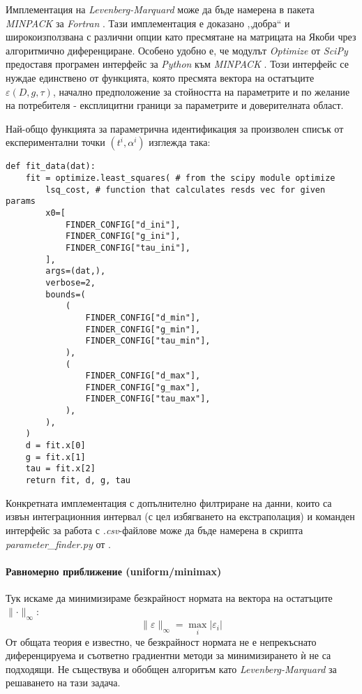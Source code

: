 Имплементация на \textit{Levenberg-Marquard} може да бъде намерена в пакета \textit{MIN\-PACK} за \textit{Fortran} \cite{MinpackGH}. Тази импле\-мен\-та\-ция е доказано ,,добра`` и ши\-ро\-ко\-изпол\-звана с различни опции като пресмятане на матрицата на Якоби чрез алгоритмично диференциране. Особено удобно е, че модулът \textit{Optimize} от \textit{SciPy} предоставя програмен интерфейс за \textit{Python} към \textit{MINPACK} \cite{2020SciPy-NMeth}. Този интерфейс се нуждае единствено от функцията, която пресмята вектора на остатъците $\varepsilon(D,g,\tau)$, начално предположение за стойността на параметрите и по желание на потребителя - експлицитни граници за параметрите и доверителната област.

Най-общо функцията за параметрична идентификация за произволен списък от експериментални точки $(t^{i}, \alpha^i)$ изглежда така:
\begin{verbatim}
def fit_data(dat):
    fit = optimize.least_squares( # from the scipy module optimize
        lsq_cost, # function that calculates resds vec for given params
        x0=[
            FINDER_CONFIG["d_ini"],
            FINDER_CONFIG["g_ini"],
            FINDER_CONFIG["tau_ini"],
        ],
        args=(dat,),
        verbose=2,
        bounds=(
            (
                FINDER_CONFIG["d_min"],
                FINDER_CONFIG["g_min"],
                FINDER_CONFIG["tau_min"],
            ),
            (
                FINDER_CONFIG["d_max"],
                FINDER_CONFIG["g_max"],
                FINDER_CONFIG["tau_max"],
            ),
        ),
    )
    d = fit.x[0]
    g = fit.x[1]
    tau = fit.x[2]
    return fit, d, g, tau
\end{verbatim}

Конкретната имплементация с допълнително филтриране на данни, които са извън интеграционния интервал (с цел избягването на екстраполация) и команден интерфейс за работа с \textit{.csv}-файлове може да бъде намерена в скрипта \textit{parameter_finder.py} от \cite{SigmoidToolsGH}.

\paragraph{Равномерно приближение (uniform/minimax)} Тук искаме да минимизираме безкрайност нормата на вектора на остатъците $\lVert \cdot \rVert_{\infty}$:
\begin{equation*}
    \lVert \varepsilon \rVert_{\infty} = \max_{i} | \varepsilon_i| 
\end{equation*}
От общата теория е известно, че безкрайност нормата не е непрекъснато диференцируема и съответно градиентни методи за минимизирането ѝ не са подходящи. Не съществува и обобщен алгоритъм като \textit{Levenberg-Marquard} за решаването на тази задача.

